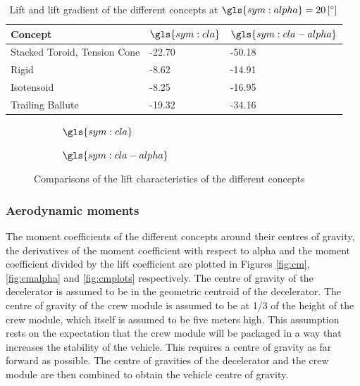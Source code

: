 \begin{table}[H]
	\caption{Lift and lift gradient of the different concepts at $\gls{sym:alpha}=20\left[^\circ\right]$}%
	\label{tab:lift}%
	\begin{tabular}{|p{}|p{}|p{}|}
		\hline
		Concept  					& $\gls{sym:cla}$	& $\gls{sym:cla-alpha}$	\\ \hline \hline
		Stacked Toroid, Tension Cone	& -22.70     		& -50.18				\\ \hline
		Rigid  							& -8.62				& -14.91				\\ \hline
		Isotensoid  					& -8.25				& -16.95				\\ \hline
		Trailing Ballute				& -19.32			& -34.16				\\ \hline				
	\end{tabular}
\end{table}

\begin{figure}[h]
	\centering
	\begin{subfigure}[b]{0.49\textwidth}
		\setlength{} 
		\setlength{}
		
		\caption{$\gls{sym:cla}$}
		\label{fig:cl}
	\end{subfigure}
	\begin{subfigure}[b]{0.49\textwidth}
		\setlength{} 
		\setlength{}
		
		\caption{$\gls{sym:cla-alpha}$}
		\label{fig:claplha}
	\end{subfigure}
	\caption{Comparisons of the lift characteristics of the different concepts}
	\label{fig:clplots}
\end{figure}



\subsubsection{Aerodynamic moments}
The moment coefficients of the different concepts around their centres of gravity, the derivatives of the moment coefficient with respect to alpha and the moment coefficient divided by the lift coefficient are plotted in Figures \ref{fig:cm}, \ref{fig:cmalpha} and \ref{fig:cmplots} respectively. The centre of gravity of the decelerator is assumed to be in the geometric centroid of the decelerator. The centre of gravity of the crew module is assumed to be at 1/3 of the height of the crew module, which itself is assumed to be five meters high. This assumption rests on the expectation that the crew module will be packaged in a way that increases the stability of the vehicle. This requires a centre of gravity as far forward as possible. The centre of gravities of the decelerator and the crew module are then combined to obtain the vehicle centre of gravity. 

